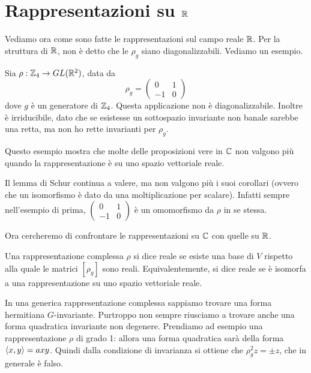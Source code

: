 \section{Rappresentazioni su $\mathbb R$}
	Vediamo ora come sono fatte le rappresentazioni sul campo reale $\mathbb R$. Per la struttura di $\mathbb R$, non è detto che le $\rho_g$ siano diagonalizzabili. Vediamo un esempio.
	
	\begin{myexample}
		Sia $\rho: \mathbb Z_4 \rightarrow GL(\mathbb R^2)$, data da 
			\[
				\rho_g = \left(
					\begin{matrix}
						0 	& 	1 	\\
						-1 	& 	0
					\end{matrix}
				\right)
			\]
		dove $g$ è un generatore di $\mathbb Z_4$. Questa applicazione non è diagonalizzabile. Inoltre è irriducibile, dato che se esistesse un sottospazio invariante non banale sarebbe una retta, ma non ho rette invarianti per $\rho_g$.
	\end{myexample}
	
	Questo esempio mostra che molte delle proposizioni vere in $\mathbb C$ non valgono più quando la rappresentazione è su uno spazio vettoriale reale.
	
	Il lemma di Schur continua a valere, ma non valgono più i suoi corollari (ovvero che un isomorfismo è dato da una moltiplicazione per scalare). Infatti sempre nell'esempio di prima, 
	$
		\left(
			\begin{matrix}
				0 	& 	1 	\\
				-1 	& 	0
			\end{matrix}
		\right)
	$ è un omomorfismo da $\rho$ in se stessa.
	
	Ora cercheremo di confrontare le rappresentazioni su $\mathbb C$ con quelle su $\mathbb R$.
	
	\begin{mydef}
	 Una rappresentazione complessa $\rho$ si dice reale se esiste una base di $V$ rispetto alla quale le matrici $[\rho_g]$ sono reali. Equivalentemente, si dice reale se è isomorfa a una rappresentazione su uno spazio vettoriale reale.
	\end{mydef}

	In una generica rappresentazione complessa sappiamo trovare una forma hermitiana $G$-invariante. Purtroppo non sempre riusciamo a trovare anche una forma quadratica invariante non degenere. Prendiamo ad esempio una rappresentazione $\rho$ di grado 1: allora una forma quadratica sarà della forma $\langle x , y\rangle = axy$. Quindi dalla condizione di invarianza si ottiene che $\rho_g^2 z = \pm z$, che in generale è falso.
	
